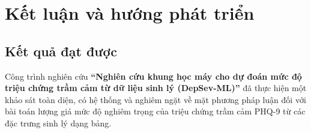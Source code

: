 \chapter{Kết luận và hướng phát triển}
\label{ch:ket-luan}

\section{Kết quả đạt được}
\label{sec:ket-qua-dat-duoc}

Công trình nghiên cứu \textbf{“Nghiên cứu khung học máy cho dự đoán mức độ triệu chứng trầm cảm từ dữ liệu sinh lý (DepSev-ML)”} đã thực hiện một khảo sát toàn diện, có hệ thống và nghiêm ngặt về mặt phương pháp luận đối với bài toán lượng giá mức độ nghiêm trọng của triệu chứng trầm cảm PHQ-9 từ các đặc trưng sinh lý dạng bảng. 


